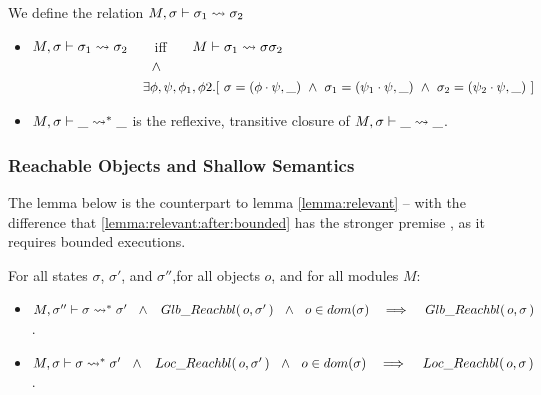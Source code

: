 {
\begin{definition}
\label{def:shallow:term}
We define the relation  $M, \sigma \vdash {\sigma_1} \leadsto \sigma_2$ 

\begin{itemize}
\item
 $M, \sigma \vdash {\sigma_1} \leadsto \sigma_2$ \ \ \ iff \ \ \  $M \vdash \sigma_1 \leadsto {\sigma} {\sigma_2}$\\
$\strut  \hspace{3cm} \wedge $\\
$\strut  \hspace{2.7cm}\ \    \exists \phi,\psi, \phi_1, \phi2.[ \ \sigma = (\phi\cdot\psi,\_) \ \wedge \ \sigma_1 = (\psi_1\cdot \psi, \_)
\ \wedge\ \sigma_2 = (\psi_2\cdot \psi, \_)\ ] $ 
\item
 $M, \sigma \vdash {\_} \leadsto^* \_$ is the reflexive, transitive closure of $M, \sigma \vdash {\_} \leadsto \_$.
\end{itemize}
\end{definition}
}
 
 
\subsubsection{{Reachable  Objects and Shallow Semantics}}


The lemma below is the counterpart to lemma \ref{lemma:relevant} --  with the difference that  \ref{lemma:relevant:after:bounded} has the  stronger  premise  , as it requires bounded executions. 

\begin{lemma}
\label{lemma:relevant:after:bounded}
For all states $\sigma$, $\sigma'$, and $\sigma''$,for all objects $o$, and for all modules  $M$:
\begin{itemize}
\item
${\leadstoBoundedStar {M}  {\sigma} {\sigma''} {\sigma'}} \ \ \wedge \ \  \GRelevant o {\sigma'} \ \ \wedge\ \ o\in dom(\sigma)\ \ \ \Longrightarrow \ \  \ \GRelevant o {\sigma}$.
\item
${\leadstoBoundedStar {M}  {\sigma}  {\sigma} {\sigma'}} \ \ \wedge \ \   \LRelevant o {\sigma'}\  \ \wedge\ \ o\in dom(\sigma)\ \ \ \Longrightarrow \ \ \ \LRelevant o {\sigma}$.
\end{itemize}
\end{lemma}

